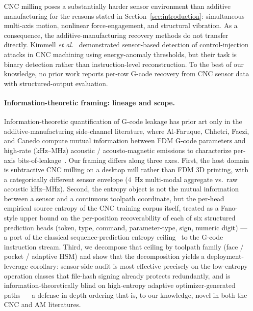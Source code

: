 \documentclass[sensors,article,submit,moreauthors,pdftex]{Definitions/mdpi}
\newcommand{\etal}{\textit{et al.}}
\begin{document}
CNC milling poses a substantially harder sensor environment than additive manufacturing for the reasons stated in Section~\ref{sec:introduction}: simultaneous multi-axis motion, nonlinear force-engagement, and structural vibration. As a consequence, the additive-manufacturing recovery methods do not transfer directly. Kimmell \etal~\cite{kimmell2025cnc} demonstrated sensor-based detection of control-injection attacks in CNC machining using energy-anomaly thresholds, but their task is binary detection rather than instruction-level reconstruction. To the best of our knowledge, no prior work reports per-row G-code recovery from CNC sensor data with structured-output evaluation.

\paragraph{Information-theoretic framing: lineage and scope.} Information-theoretic quantification of G-code leakage has prior art only in the additive-manufacturing side-channel literature, where Al-Faruque, Chhetri, Faezi, and Canedo compute mutual information between FDM G-code parameters and high-rate (kHz--MHz) acoustic / acousto-magnetic emissions to characterize per-axis bits-of-leakage~\cite{chhetri2017confidentiality,faezi2020oligosnoop}. Our framing differs along three axes. First, the host domain is subtractive CNC milling on a desktop mill rather than FDM 3D printing, with a categorically different sensor envelope (4~Hz multi-modal aggregate vs.~raw acoustic kHz--MHz). Second, the entropy object is not the mutual information between a sensor and a continuous toolpath coordinate, but the per-head empirical source entropy of the CNC training corpus itself, treated as a Fano-style upper bound on the per-position recoverability of each of six structured prediction heads (token, type, command, parameter-type, sign, numeric digit) --- a port of the classical sequence-prediction entropy ceiling~\cite{brown1992englishentropy,feder1994relations,cover_thomas} to the G-code instruction stream. Third, we decompose that ceiling by toolpath family (face / pocket / adaptive HSM) and show that the decomposition yields a deployment-leverage corollary: sensor-side audit is most effective precisely on the low-entropy operation classes that file-hash signing already protects redundantly, and is information-theoretically blind on high-entropy adaptive optimizer-generated paths --- a defense-in-depth ordering that is, to our knowledge, novel in both the CNC and AM literatures.
\end{document}
